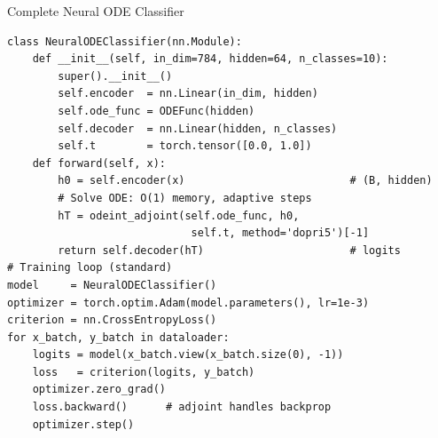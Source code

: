 \documentclass[aspectratio=169,xcolor=dvipsnames,svgnames,x11names,fleqn]{beamer}
\begin{document}
\begin{frame}[fragile]{Complete Neural ODE Classifier}


\begin{verbatim}
class NeuralODEClassifier(nn.Module):
    def __init__(self, in_dim=784, hidden=64, n_classes=10):
        super().__init__()
        self.encoder  = nn.Linear(in_dim, hidden)
        self.ode_func = ODEFunc(hidden)
        self.decoder  = nn.Linear(hidden, n_classes)
        self.t        = torch.tensor([0.0, 1.0])
    def forward(self, x):
        h0 = self.encoder(x)                          # (B, hidden)
        # Solve ODE: O(1) memory, adaptive steps
        hT = odeint_adjoint(self.ode_func, h0,
                             self.t, method='dopri5')[-1]
        return self.decoder(hT)                       # logits
# Training loop (standard)
model     = NeuralODEClassifier()
optimizer = torch.optim.Adam(model.parameters(), lr=1e-3)
criterion = nn.CrossEntropyLoss()
for x_batch, y_batch in dataloader:
    logits = model(x_batch.view(x_batch.size(0), -1))
    loss   = criterion(logits, y_batch)
    optimizer.zero_grad()
    loss.backward()      # adjoint handles backprop
    optimizer.step()
\end{verbatim}

\end{frame}
 
\end{document}

